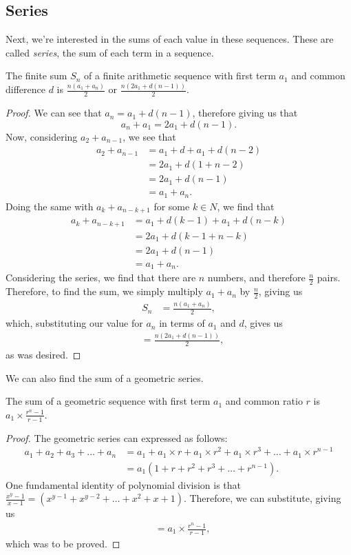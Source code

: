 \documentclass[11pt]{article}
\begin{document}
\subsection{Series}
Next, we're interested in the sums of each value in these sequences. These are called \textit{series}, the sum of each term in a sequence.

\begin{thrm}
	The finite sum $S_n$ of a finite arithmetic sequence with first term $a_1$ and common difference $d$ is $\frac{n(a_1+a_n)}{2}$ or $\frac{n(2a_1+d(n-1))}{2}$.
\end{thrm}\begin{proof}
	We can see that $a_n = a_1 + d(n-1)$, therefore giving us that
	\[a_n + a_1 = 2a_1 + d(n-1).\]
	Now, considering $a_2 + a_{n-1}$, we see that
	\begin{align*}
		a_2 + a_{n-1} &= a_1 + d + a_1 + d(n - 2) \\
		&= 2a_1 + d(1 + n - 2) \\
		&= 2a_1 + d(n-1) \\
		&= a_1 + a_n.
	\end{align*}
	Doing the same with $a_k + a_{n-k+1}$ for some $k \in N$, we find that
	\begin{align*}
		a_k + a_{n-k+1} & = a_1 + d(k-1) + a_1 + d(n - k) \\
		&= 2a_1 + d(k-1 + n - k) \\
		&= 2a_1 + d(n-1) \\
		&= a_1 + a_n.
	\end{align*}
	Considering the series, we find that there are $n$ numbers, and therefore $\frac{n}{2}$ pairs. Therefore, to find the sum, we simply multiply $a_1 + a_n$ by $\frac{n}{2}$, giving us
	\begin{align*}
		S_n &= \frac{n(a_1 + a_n)}{2},
	\end{align*}
	which, substituting our value for $a_n$ in terms of $a_1$ and $d$, gives us
	\begin{align*}
		&= \frac{n(2a_1 + d(n-1))}{2},
	\end{align*}
	as was desired.
\end{proof}
We can also find the sum of a geometric series.
\begin{thrm}
	The sum of a geometric sequence with first term $a_1$ and common ratio $r$ is $a_1\times\frac{r^n-1}{r-1}$.
\end{thrm}
\begin{proof}
	The geometric series can expressed as follows:
	\begin{align*}
		a_1 + a_2 + a_3 + ... + a_n &= a_1 + a_1\times r + a_1\times r^2 + a_1\times r^3 + \dots + a_1\times r^{n-1} \\
		&= a_1(1 + r + r^2 + r^3 + \dots + r^{n-1}).
	\end{align*}
	One fundamental identity of polynomial division is that $\frac{x^y - 1}{x - 1} = (x^{y-1} + x^{y-2} + \dots + x^2 + x + 1)$. Therefore, we can substitute, giving us
	\begin{align*}
		&= a_1\times\frac{r^n-1}{r-1},
	\end{align*}
	which was to be proved.
\end{proof}
\end{document}
